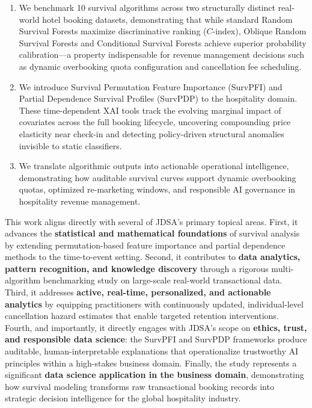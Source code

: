 \documentclass[10.5pt,a4paper]{article}
\begin{document}
\begin{enumerate}
    \setlength{\itemsep}{0pt}
    \setlength{\parskip}{1pt}
    \item We benchmark 10 survival algorithms across two structurally distinct real-world hotel booking datasets, demonstrating that while standard Random Survival Forests maximize discriminative ranking ($C$-index), Oblique Random Survival Forests and Conditional Survival Forests achieve superior probability calibration---a property indispensable for revenue management decisions such as dynamic overbooking quota configuration and cancellation fee scheduling.
    \item We introduce Survival Permutation Feature Importance (SurvPFI) and Partial Dependence Survival Profiles (SurvPDP) to the hospitality domain. These time-dependent XAI tools track the evolving marginal impact of covariates across the full booking lifecycle, uncovering compounding price elasticity near check-in and detecting policy-driven structural anomalies invisible to static classifiers.
    \item We translate algorithmic outputs into actionable operational intelligence, demonstrating how auditable survival curves support dynamic overbooking quotas, optimized re-marketing windows, and responsible AI governance in hospitality revenue management.
\end{enumerate}

This work aligns directly with several of JDSA's primary topical areas. First, it advances the \textbf{statistical and mathematical foundations} of survival analysis by extending permutation-based feature importance and partial dependence methods to the time-to-event setting. Second, it contributes to \textbf{data analytics, pattern recognition, and knowledge discovery} through a rigorous multi-algorithm benchmarking study on large-scale real-world transactional data. Third, it addresses \textbf{active, real-time, personalized, and actionable analytics} by equipping practitioners with continuously updated, individual-level cancellation hazard estimates that enable targeted retention interventions. Fourth, and importantly, it directly engages with JDSA's scope on \textbf{ethics, trust, and responsible data science}: the SurvPFI and SurvPDP frameworks produce auditable, human-interpretable explanations that operationalize trustworthy AI principles within a high-stakes business domain. Finally, the study represents a significant \textbf{data science application in the business domain}, demonstrating how survival modeling transforms raw transactional booking records into strategic decision intelligence for the global hospitality industry.\\
\end{document}
